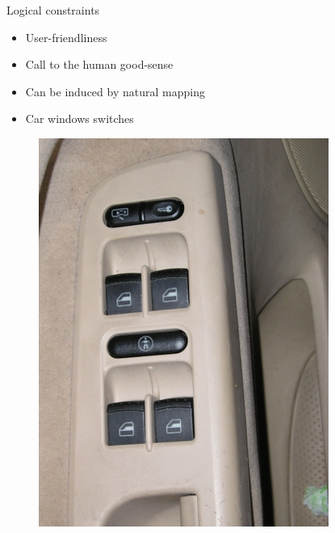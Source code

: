 \documentclass{beamer}
\begin{document}
\begin{frame}{Logical constraints}
    \begin{itemize}
    		\item User-friendliness
    		\item Call to the human good-sense
            \item Can be induced by natural mapping
    		\item Car windows switches
    \end{itemize}
     \begin{figure}
             \includegraphics[scale=0.25]{window.jpg}
             \end{figure}
\end{frame}
\end{document}
